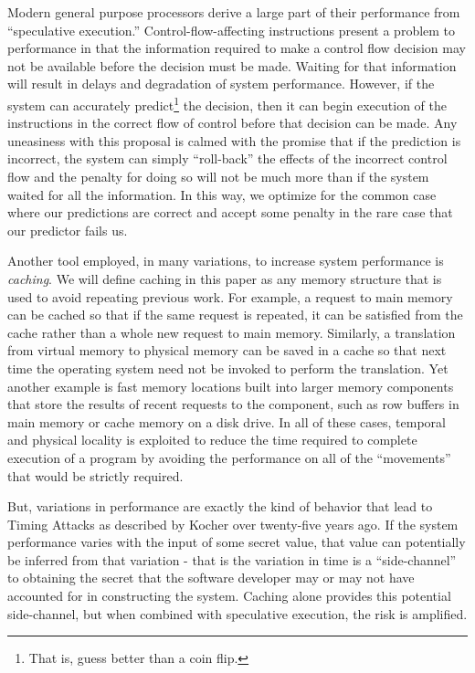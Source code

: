 \documentclass[11pt,conference]{IEEEtran}
\begin{document}
Modern general purpose processors derive a large part of their performance from ``speculative execution.''
Control-flow-affecting instructions present a problem to performance in that the information required to make a control flow decision may not be available before the decision must be made.
Waiting for that information will result in delays and degradation of system performance.
However, if the system can accurately predict\footnote{That is, guess better than a coin flip.} the decision, then it can begin execution of the instructions in the correct flow of control before that decision can be made.
Any uneasiness with this proposal is calmed with the promise that if the prediction is incorrect, the system can simply ``roll-back'' the effects of the incorrect control flow and the penalty for doing so will not be much more than if the system waited for all the information.
In this way, we optimize for the common case where our predictions are correct and accept some penalty in the rare case that our predictor fails us.

Another tool employed, in many variations, to increase system performance is \emph{caching}.
We will define caching in this paper as any memory structure that is used to avoid repeating previous work.
For example, a request to main memory can be cached so that if the same request is repeated, it can be satisfied from the cache rather than a whole new request to main memory.
Similarly, a translation from virtual memory to physical memory can be saved in a cache so that next time the operating system need not be invoked to perform the translation.
Yet another example is fast memory locations built into larger memory components that store the results of recent requests to the component, such as row buffers in main memory or cache memory on a disk drive.
In all of these cases, temporal and physical locality is exploited to reduce the time required to complete execution of a program by avoiding the performance on all of the ``movements'' that would be strictly required.

But, variations in performance are exactly the kind of behavior that lead to Timing Attacks as described by Kocher over twenty-five years ago\cite{kocher96}.
If the system performance varies with the input of some secret value, that value can potentially be inferred from that variation - that is the variation in time is a ``side-channel'' to obtaining the secret that the software developer may or may not have accounted for in constructing the system.
Caching alone provides this potential side-channel\cite{shepherd2022transient}, but when combined with speculative execution, the risk is amplified.
\end{document}
